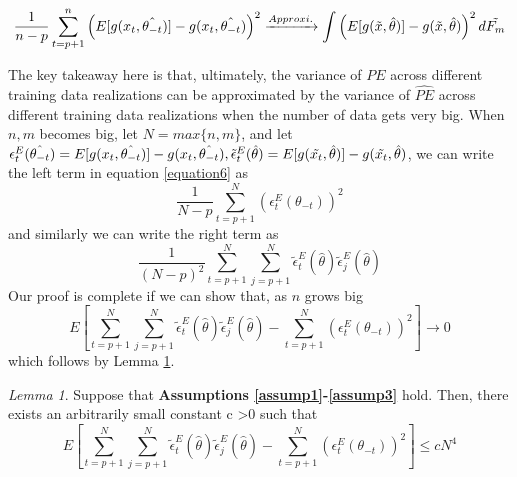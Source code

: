 \documentclass[12pt, oneside]{amsart}
\theoremstyle{definition}
\theoremstyle{remark}
\numberwithin{equation}{section}
\begin{document}
\begin{equation}\label{equation6}
   \frac{1}{n-p}\sum_{t=p+1}^n \left( E[g(x_t, \hat{\theta_{-t}})] - g(x_t, \hat{\theta_{-t}}) \right)^2 \xrightarrow{Approxi.} \int \left(E[g(\Tilde{x}, \hat{\theta})] - g(\Tilde{x},\hat{\theta})\right)^2 d\tilde{F_m} 
\end{equation}


The key takeaway here is that, ultimately, the variance of $PE$ across different training data realizations can be approximated by the variance of $\hat{PE}$ across different training data realizations when the number of data gets very big. When $n, m$ becomes big, let $N = max \{n, m\}$, and let $\epsilon^E_t(\hat{\theta_{-t}}) = E[g(x_t, \hat{\theta_{-t}})] - g(x_t,\hat{\theta_{-t}}), \tilde{\epsilon}^E_t(
\hat{\theta}
) = E[g(\Tilde{x_t}, \hat{\theta})] - g(\Tilde{x_t},\hat{\theta})$, we can write the left term in equation \ref{equation6} as
$$  \frac{1}{N-p} \sum_{t=p+1}^N  \left( \epsilon^E_t(\theta_{-t}) \right)^2$$and similarly we can write the right term as $$  \frac{1}{(N-p)^2} \sum_{t=p+1}^N \sum_{j=p+1}^N  \tilde{\epsilon}^E_t(\hat{\theta}) \tilde{\epsilon}^E_j(\hat{\theta})$$
Our proof is complete if we can show that, as $n$ grows big
$$E\left[ \sum_{t=p+1}^N \sum_{j=p+1}^N  \tilde{\epsilon}^E_t(\hat{\theta}) \tilde{\epsilon}^E_j(\hat{\theta}) - \sum_{t=p+1}^N  \left( \epsilon^E_t(\theta_{-t}) \right)^2 \right] \rightarrow 0 $$ 
which follows by Lemma \ref{lemma1}. 
\newtheorem{lemma}{Lemma}
\begin{lemma}\label{lemma1}
    Suppose that \textbf{Assumptions \ref{assump1}-\ref{assump3}} hold. Then, there exists an arbitrarily small constant c \textgreater 0 such that $$E \left[  \sum_{t=p+1}^N \sum_{j=p+1}^N   \tilde{\epsilon}^E_t(\hat{\theta}) \tilde{\epsilon}^E_j(\hat{\theta}) - \sum_{t=p+1}^N  \left( \epsilon^E_t(\theta_{-t}) \right)^2 \right] \leq cN^4$$
\end{lemma}
\end{document}

